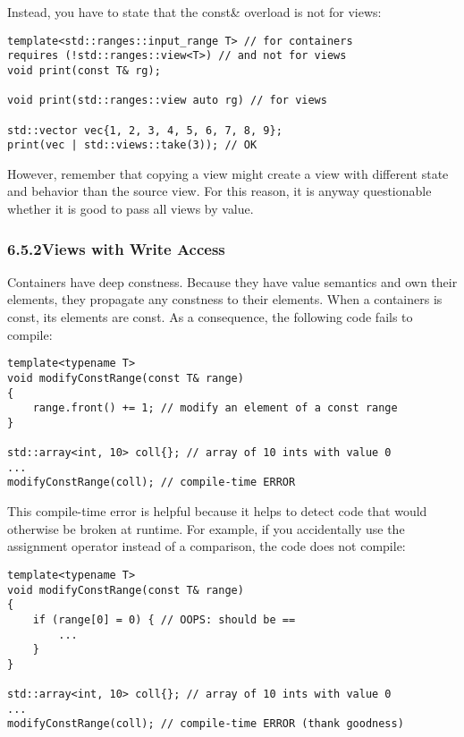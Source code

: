 Instead, you have to state that the const\& overload is not for views:

\begin{lstlisting}[style=styleCXX]
template<std::ranges::input_range T> // for containers
requires (!std::ranges::view<T>) // and not for views
void print(const T& rg);

void print(std::ranges::view auto rg) // for views

std::vector vec{1, 2, 3, 4, 5, 6, 7, 8, 9};
print(vec | std::views::take(3)); // OK
\end{lstlisting}

However, remember that copying a view might create a view with different state and behavior than the source view. For this reason, it is anyway questionable whether it is good to pass all views by value.

\subsubsection*{ 6.5.2\hspace{0.2cm}Views with Write Access}

Containers have deep constness. Because they have value semantics and own their elements, they propagate any constness to their elements. When a containers is const, its elements are const. As a consequence, the following code fails to compile:

\begin{lstlisting}[style=styleCXX]
template<typename T>
void modifyConstRange(const T& range)
{
	range.front() += 1; // modify an element of a const range
}

std::array<int, 10> coll{}; // array of 10 ints with value 0
...
modifyConstRange(coll); // compile-time ERROR
\end{lstlisting}

This compile-time error is helpful because it helps to detect code that would otherwise be broken at runtime. For example, if you accidentally use the assignment operator instead of a comparison, the code does not compile:

\begin{lstlisting}[style=styleCXX]
template<typename T>
void modifyConstRange(const T& range)
{
	if (range[0] = 0) { // OOPS: should be ==
		...
	}
}

std::array<int, 10> coll{}; // array of 10 ints with value 0
...
modifyConstRange(coll); // compile-time ERROR (thank goodness)
\end{lstlisting}

